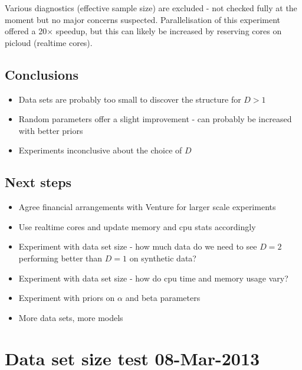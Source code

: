 \documentclass[twoside,11pt]{article}
\begin{document}
Various diagnostics (\eg effective sample size) are excluded - not checked fully at the moment but no major concerns suspected.
Parallelisation of this experiment offered a 20$\times$ speedup, but this can likely be increased by reserving cores on picloud (realtime cores).

\subsection{Conclusions}

\begin{itemize}
\item Data sets are probably too small to discover the structure for $D > 1$
\item Random parameters offer a slight improvement - can probably be increased with better priors
\item Experiments inconclusive about the choice of $D$
\end{itemize}

\subsection{Next steps}

\begin{itemize}
\item Agree financial arrangements with Venture for larger scale experiments
\item Use realtime cores and update memory and cpu stats accordingly
\item Experiment with data set size - how much data do we need to see $D = 2$ performing better than $D = 1$ on synthetic data?
\item Experiment with data set size - how do cpu time and memory usage vary?
\item Experiment with priors on $\alpha$ and beta parameters
\item More data sets, more models
\end{itemize}

\section{Data set size test 08-Mar-2013}

\end{document}
